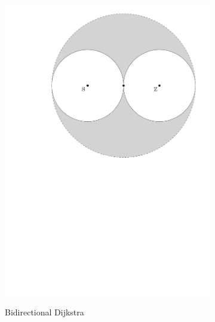 \begin{figure}[htb]
\begin{subfigure}{0.30\textwidth}
\includegraphics[width = \textwidth]{../media/bidijkstra.pdf} \\
\caption{Bidirectional Dijkstra}
\label{fig:biD}
\end{subfigure}
\begin{subfigure}{0.30\textwidth}
\centering
\vspace{1.1cm}

\end{subfigure}
\end{figure}
